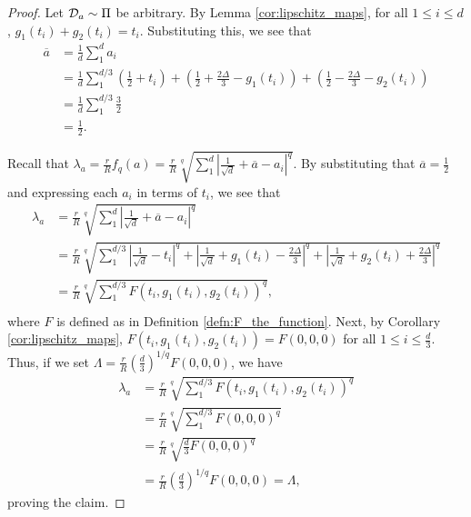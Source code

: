 \begin{proof}
Let ${\mathcal D}_a \sim \Pi$ be arbitrary. By Lemma \ref{cor:lipschitz_maps}, for all $1 \leq i \leq d$, $g_1(t_i) + g_2(t_i) = t_i$. Substituting this, we see that 
\begin{equation*}
\begin{split}
\overline{a} &= \frac{1}{d}\sum_1^d a_i \\
&= \frac{1}{d}\sum_1^{d/3} (\frac{1}{2} + t_i) + (\frac{1}{2} + \frac{2\Delta}{3} - g_1(t_i)) + (\frac{1}{2} - \frac{2\Delta}{3} - g_2(t_i)) \\
&= \frac{1}{d}\sum_1^{d/3} \frac{3}{2} \\
&= \frac{1}{2}.
\end{split}
\end{equation*}

Recall that $\lambda_a = \frac{r}{R}f_q(a) = \frac{r}{R}\sqrt[q]{\sum_1^d |\frac{1}{\sqrt{d}} + \overline{a} - a_i|^q}$. By substituting that $\overline{a} = \frac{1}{2}$ and expressing each $a_i$ in terms of $t_i$, we see that 
\begin{equation*}
\begin{split}
\lambda_a &=  \frac{r}{R}\sqrt[q]{\sum_1^d |\frac{1}{\sqrt{d}} + \overline{a} - a_i|^q}\\
 &= \frac{r}{R}\sqrt[q]{\sum_1^{d/3} \left|\frac{1}{\sqrt{d}} - t_i\right|^q + \left|\frac{1}{\sqrt{d}} + g_1(t_i) - \frac{2\Delta}{3}\right|^q + \left|\frac{1}{\sqrt{d}} + g_2(t_i) + \frac{2\Delta}{3}\right|^q} \\
&= \frac{r}{R}\sqrt[q]{\sum_1^{d/3}F(t_i, g_1(t_i), g_2(t_i))^q}, \\
\end{split}
\end{equation*}
where $F$ is defined as in Definition \ref{defn:F_the_function}. Next, by Corollary \ref{cor:lipschitz_maps}, $F(t_i, g_1(t_i), g_2(t_i)) = F(0,0,0)$ for all $1 \leq i \leq \frac{d}{3}$. Thus, if we set $\Lambda = \frac{r}{R}(\frac{d}{3})^{1/q}F(0,0,0)$, we have 
\begin{equation*}
\begin{split}
\lambda_a &= \frac{r}{R}\sqrt[q]{\sum_1^{d/3} F(t_i, g_1(t_i), g_2(t_i))^q} \\
&= \frac{r}{R}\sqrt[q]{\sum_1^{d/3}F(0,0,0)^q} \\
&= \frac{r}{R}\sqrt[q]{\frac{d}{3}F(0,0,0)^q} \\
&=  \frac{r}{R}(\frac{d}{3})^{1/q}F(0,0,0) = \Lambda,
\end{split}
\end{equation*}
proving the claim.
\end{proof}

